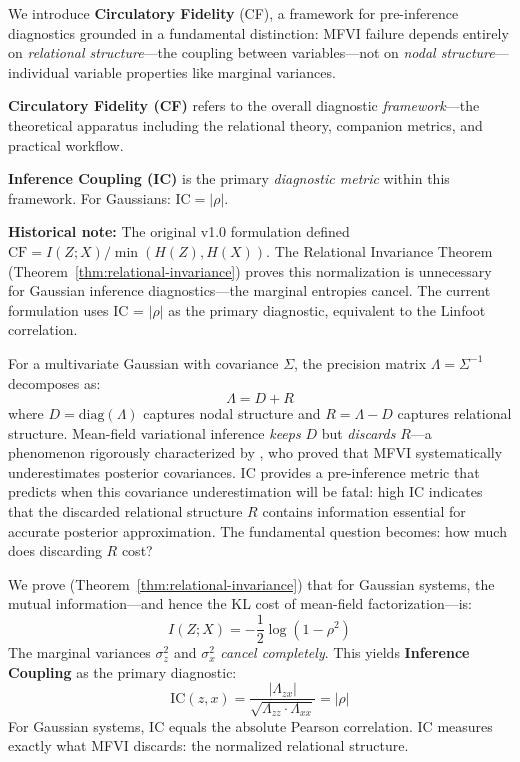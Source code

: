 \documentclass[10pt]{article} %
\theoremstyle{plain}
\theoremstyle{definition}
\newcommand{\IC}{\mathrm{IC}}  %
\begin{document}
We introduce \textbf{Circulatory Fidelity} (CF), a framework for pre-inference diagnostics grounded in a fundamental distinction: MFVI failure depends entirely on \emph{relational structure}---the coupling between variables---not on \emph{nodal structure}---individual variable properties like marginal variances.

\begin{tcolorbox}[colback=blue!5, colframe=blue!50!black, title=\textbf{Notation: CF Framework vs.\ IC Diagnostic}]
\textbf{Circulatory Fidelity (CF)} refers to the overall diagnostic \emph{framework}---the theoretical apparatus including the relational theory, companion metrics, and practical workflow.

\textbf{Inference Coupling (IC)} is the primary \emph{diagnostic metric} within this framework. For Gaussians: $\IC = |\rho|$.

\textbf{Historical note:} The original v1.0 formulation defined $\text{CF} = I(Z;X)/\min(H(Z), H(X))$. The Relational Invariance Theorem (Theorem~\ref{thm:relational-invariance}) proves this normalization is unnecessary for Gaussian inference diagnostics---the marginal entropies cancel. The current formulation uses IC = $|\rho|$ as the primary diagnostic, equivalent to the Linfoot correlation.
\end{tcolorbox}

For a multivariate Gaussian with covariance $\Sigma$, the precision matrix $\Lambda = \Sigma^{-1}$ decomposes as:
\begin{equation}
\Lambda = D + R
\label{eq:decomposition}
\end{equation}
where $D = \text{diag}(\Lambda)$ captures nodal structure and $R = \Lambda - D$ captures relational structure. Mean-field variational inference \emph{keeps} $D$ but \emph{discards} $R$---a phenomenon rigorously characterized by \citet{giordano2018covariances}, who proved that MFVI systematically underestimates posterior covariances. IC provides a pre-inference metric that predicts when this covariance underestimation will be fatal: high IC indicates that the discarded relational structure $R$ contains information essential for accurate posterior approximation. The fundamental question becomes: how much does discarding $R$ cost?

We prove (Theorem~\ref{thm:relational-invariance}) that for Gaussian systems, the mutual information---and hence the KL cost of mean-field factorization---is:
\begin{equation}
I(Z; X) = -\frac{1}{2}\log(1 - \rho^2)
\end{equation}
The marginal variances $\sigma_z^2$ and $\sigma_x^2$ \emph{cancel completely}. This yields \textbf{Inference Coupling} as the primary diagnostic:
\begin{equation}
\IC(z, x) = \frac{|\Lambda_{zx}|}{\sqrt{\Lambda_{zz} \cdot \Lambda_{xx}}} = |\rho|
\label{eq:ic}
\end{equation}
For Gaussian systems, IC equals the absolute Pearson correlation. IC measures exactly what MFVI discards: the normalized relational structure.
\end{document}

